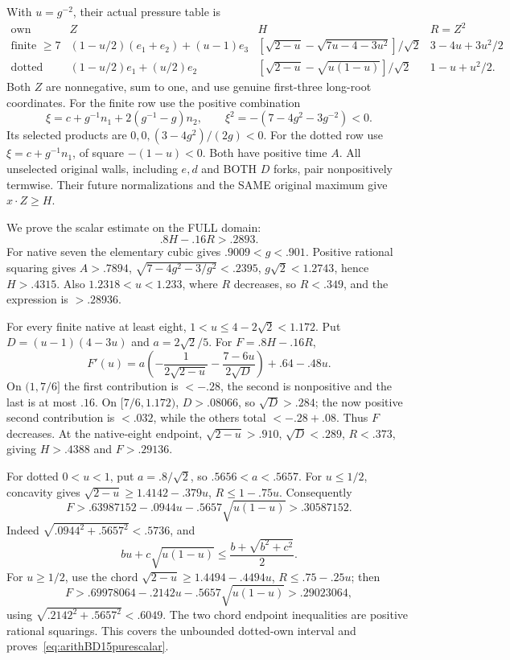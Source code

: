 \documentclass[11pt]{article}
\begin{document}
With \(u=g^{-2}\), their actual pressure table is
\[
\begin{array}{c|c|c|c}
 \text{own}&Z&H&R=Z^2\\ \hline
 \text{finite }\ge7&
 (1-u/2)(e_1+e_2)+(u-1)e_3&
 [\sqrt{2-u}-\sqrt{7u-4-3u^2}]/\sqrt2&
 3-4u+3u^2/2\\
 \text{dotted}&
 (1-u/2)e_1+(u/2)e_2&
 [\sqrt{2-u}-\sqrt{u(1-u)}]/\sqrt2&
 1-u+u^2/2 .
\end{array}
\]
Both \(Z\) are nonnegative, sum to one, and use genuine
first-three long-root coordinates.
For the finite row use the positive combination
\[
 \xi=c+g^{-1}n_1+2(g^{-1}-g)n_2,\qquad
 \xi^2=-(7-4g^2-3g^{-2})<0 .
\]
Its selected products are \(0,0,(3-4g^2)/(2g)<0\).
For the dotted row use
\(\xi=c+g^{-1}n_1\), of square \(-(1-u)<0\).
Both have positive time \(A\).
All unselected original walls, including \(e,d\) and
BOTH \(D\) forks, pair nonpositively termwise.
Their future normalizations and the SAME original
maximum give \(x\cdot Z\ge H\).

We prove the scalar estimate on the FULL domain:
\[
                         .8H-.16R>.2893 .
\tag{R1S}\label{eq:arithBD15purescalar}
\]
For native seven the elementary cubic gives
\(.9009<g<.901\).
Positive rational squaring gives \(A>.7894\),
\(\sqrt{7-4g^2-3/g^2}<.2395\), \(g\sqrt2<1.2743\),
hence \(H>.4315\).
Also \(1.2318<u<1.233\), where \(R\) decreases,
so \(R<.349\), and the expression is \(>.28936\).

For every finite native at least eight,
\(1<u\le4-2\sqrt2<1.172\).
Put \(D=(u-1)(4-3u)\) and \(a=2\sqrt2/5\).
For \(F=.8H-.16R\),
\[
 F'(u)=a\left(-{\frac{1}{2\sqrt{2-u}}}
             -{\frac{7-6u}{2\sqrt D}}\right)+.64-.48u .
\]
On \((1,7/6]\) the first contribution is \(<-.28\),
the second is nonpositive and the last is at most \(.16\).
On \([7/6,1.172)\), \(D>.08066\), so \(\sqrt D>.284\);
the now positive second contribution is \(<.032\),
while the others total \(<-.28+.08\).
Thus \(F\) decreases.
At the native-eight endpoint,
\(\sqrt{2-u}>.910\), \(\sqrt D<.289\), \(R<.373\),
giving \(H>.4388\) and \(F>.29136\).

For dotted \(0<u<1\), put \(a=.8/\sqrt2\),
so \(.5656<a<.5657\).
For \(u\le1/2\), concavity gives
\(\sqrt{2-u}\ge1.4142-.379u\), \(R\le1-.75u\).
Consequently
\[
 F>.63987152-.0944u-.5657\sqrt{u(1-u)}
   >.30587152 .
\]
Indeed \(\sqrt{.0944^2+.5657^2}<.5736\), and
\[
 bu+c\sqrt{u(1-u)}
 \le{\frac{b+\sqrt{b^2+c^2}}{2}}.
\]
For \(u\ge1/2\), use the chord
\(\sqrt{2-u}\ge1.4494-.4494u\), \(R\le.75-.25u\);
then
\[
 F>.69978064-.2142u-.5657\sqrt{u(1-u)}
   >.29023064,
\]
using \(\sqrt{.2142^2+.5657^2}<.6049\).
The two chord endpoint inequalities are positive
rational squarings.
This covers the unbounded dotted-own interval and
proves~\eqref{eq:arithBD15purescalar}.
\end{document}
